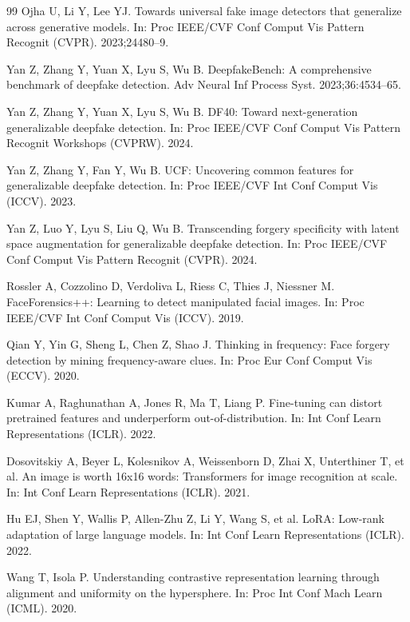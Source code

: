 \documentclass[fonts]{icst}
\begin{document}
\begin{thebibliography}{99}
Ojha U, Li Y, Lee YJ.
Towards universal fake image detectors that generalize across generative models.
In: Proc IEEE/CVF Conf Comput Vis Pattern Recognit (CVPR). 2023;24480–9.

Yan Z, Zhang Y, Yuan X, Lyu S, Wu B.
DeepfakeBench: A comprehensive benchmark of deepfake detection.
Adv Neural Inf Process Syst. 2023;36:4534–65.

Yan Z, Zhang Y, Yuan X, Lyu S, Wu B.
DF40: Toward next-generation generalizable deepfake detection.
In: Proc IEEE/CVF Conf Comput Vis Pattern Recognit Workshops (CVPRW). 2024.


Yan Z, Zhang Y, Fan Y, Wu B.
UCF: Uncovering common features for generalizable deepfake detection.
In: Proc IEEE/CVF Int Conf Comput Vis (ICCV). 2023.

Yan Z, Luo Y, Lyu S, Liu Q, Wu B.
Transcending forgery specificity with latent space augmentation for generalizable deepfake detection.
In: Proc IEEE/CVF Conf Comput Vis Pattern Recognit (CVPR). 2024.

Rossler A, Cozzolino D, Verdoliva L, Riess C, Thies J, Niessner M.
FaceForensics++: Learning to detect manipulated facial images.
In: Proc IEEE/CVF Int Conf Comput Vis (ICCV). 2019.

Qian Y, Yin G, Sheng L, Chen Z, Shao J.
Thinking in frequency: Face forgery detection by mining frequency-aware clues.
In: Proc Eur Conf Comput Vis (ECCV). 2020.

Kumar A, Raghunathan A, Jones R, Ma T, Liang P.
Fine-tuning can distort pretrained features and underperform out-of-distribution.
In: Int Conf Learn Representations (ICLR). 2022.

Dosovitskiy A, Beyer L, Kolesnikov A, Weissenborn D, Zhai X, Unterthiner T, et al.
An image is worth 16x16 words: Transformers for image recognition at scale.
In: Int Conf Learn Representations (ICLR). 2021.

Hu EJ, Shen Y, Wallis P, Allen-Zhu Z, Li Y, Wang S, et al.
LoRA: Low-rank adaptation of large language models.
In: Int Conf Learn Representations (ICLR). 2022.

Wang T, Isola P.
Understanding contrastive representation learning through alignment and uniformity on the hypersphere.
In: Proc Int Conf Mach Learn (ICML). 2020.


\end{thebibliography}
\end{document}
